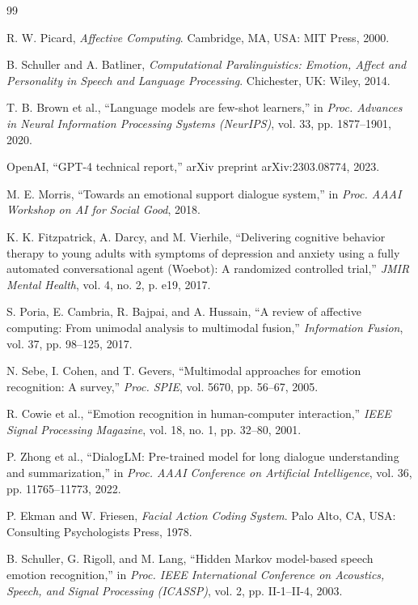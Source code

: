 \documentclass[conference]{IEEEtran}
\begin{document}
\begin{thebibliography}{99}

R. W. Picard, \textit{Affective Computing}. Cambridge, MA, USA: MIT Press, 2000.

B. Schuller and A. Batliner, \textit{Computational Paralinguistics: Emotion, Affect and Personality in Speech and Language Processing}. Chichester, UK: Wiley, 2014.

T. B. Brown et al., ``Language models are few-shot learners,'' in \textit{Proc. Advances in Neural Information Processing Systems (NeurIPS)}, vol. 33, pp. 1877--1901, 2020.

OpenAI, ``GPT-4 technical report,'' arXiv preprint arXiv:2303.08774, 2023.

M. E. Morris, ``Towards an emotional support dialogue system,'' in \textit{Proc. AAAI Workshop on AI for Social Good}, 2018.

K. K. Fitzpatrick, A. Darcy, and M. Vierhile, ``Delivering cognitive behavior therapy to young adults with symptoms of depression and anxiety using a fully automated conversational agent (Woebot): A randomized controlled trial,'' \textit{JMIR Mental Health}, vol. 4, no. 2, p. e19, 2017.

S. Poria, E. Cambria, R. Bajpai, and A. Hussain, ``A review of affective computing: From unimodal analysis to multimodal fusion,'' \textit{Information Fusion}, vol. 37, pp. 98--125, 2017.

N. Sebe, I. Cohen, and T. Gevers, ``Multimodal approaches for emotion recognition: A survey,'' \textit{Proc. SPIE}, vol. 5670, pp. 56--67, 2005.

R. Cowie et al., ``Emotion recognition in human-computer interaction,'' \textit{IEEE Signal Processing Magazine}, vol. 18, no. 1, pp. 32--80, 2001.

P. Zhong et al., ``DialogLM: Pre-trained model for long dialogue understanding and summarization,'' in \textit{Proc. AAAI Conference on Artificial Intelligence}, vol. 36, pp. 11765--11773, 2022.

P. Ekman and W. Friesen, \textit{Facial Action Coding System}. Palo Alto, CA, USA: Consulting Psychologists Press, 1978.

B. Schuller, G. Rigoll, and M. Lang, ``Hidden Markov model-based speech emotion recognition,'' in \textit{Proc. IEEE International Conference on Acoustics, Speech, and Signal Processing (ICASSP)}, vol. 2, pp. II-1--II-4, 2003.


\end{thebibliography}
\end{document}
